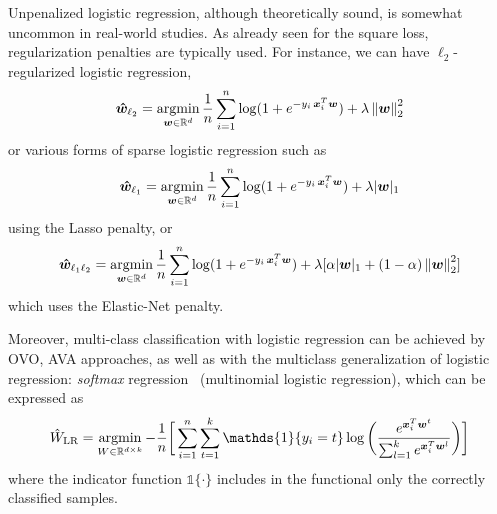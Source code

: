 			Unpenalized logistic regression, although theoretically sound, is somewhat uncommon in real-world studies. As already seen for the square loss, regularization penalties are typically used. For instance, we can have $\ell_2$-regularized logistic regression,
			\begin{equation} \label{eq:logistic_l2}
				\bm{\hat w}_{\ell_2} = \mathop{\mathrm{argmin}}\limits_{\bm{w} \in \mathbb{R}^d} \frac{1}{n}\sum_{i=1}^n\log(1 + e^{-y_i\,\bm{x}_i^T\bm{w}}) + \lambda \left\lVert\bm{w}\right\rVert_2^2
		  \end{equation}
			or various forms of sparse logistic regression such as
			\begin{equation} \label{eq:logistic_l1}
				\bm{\hat w}_{\ell_1} = \mathop{\mathrm{argmin}}\limits_{\bm{w} \in \mathbb{R}^d} \frac{1}{n}\sum_{i=1}^n\log(1 + e^{-y_i\,\bm{x}_i^T\bm{w}}) + \lambda |\bm{w}|_1
		  \end{equation}
			using the Lasso penalty, or
			\begin{equation} \label{eq:logistic_l1l2}
				\bm{\hat w}_{\ell_1\ell_2} = \mathop{\mathrm{argmin}}\limits_{\bm{w} \in \mathbb{R}^d} \frac{1}{n}\sum_{i=1}^n\log(1 + e^{-y_i\,\bm{x}_i^T\bm{w}}) + \lambda [\alpha |\bm{w}|_1 + (1-\alpha) \left\lVert\bm{w}\right\rVert_2^2]
		  \end{equation}
			which uses the Elastic-Net penalty.

			Moreover, multi-class classification with logistic regression can be achieved by OVO, AVA approaches, as well as with the multiclass generalization of logistic regression: \textit{softmax} regression~\cite{hastie2009elements} (\aka multinomial logistic regression), which can be expressed as
			\begin{equation} \label{eq:softmax}
				\hat W_{\text{LR}} = \argmin_{W \in \mathbb{R}^{d \times k}} -\frac{1}{n} \bigg[ \sum_{i=1}^n \sum_{t=1}^k \mathds{1}\{y_i = t\} \log \bigg(\frac{e^{\bm{x}_i^T\bm{w}^t}}{\sum_{l=1}^k e^{\bm{x}_i^T \bm{w}^l}} \bigg) \bigg]
			\end{equation}
			where the indicator function $\mathds{1}\{\cdot\}$ includes in the functional only the correctly classified samples.

